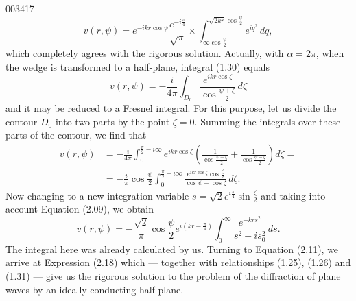 \begin{scanpage}{0034}{17}
\[v(r,\psi)=e^{-ikr\cos\psi}\frac{e^{-i\frac\pi4}}{\sqrt\pi}\times\int_{\infty\cos\frac\psi2}^{\sqrt{2kr}\cos\frac\psi2}e^{iq^2}\,dq,\tag{2.18}\]
which completely agrees with the rigorous solution. Actually, with $\alpha=2\pi$, when the wedge is transformed to a half-plane, integral (1.30) equals
\[v(r,\psi)=-\frac{i}{4\pi}\int_{D_0}\frac{e^{ikr\cos\zeta}}{\cos\frac{\psi+\zeta}{2}}\,d\zeta\tag{2.19}\]
and it may be reduced to a Fresnel integral. For this purpose, let us divide the contour $D_0$ into two parts by the point $\zeta=0$. Summing the integrals over these parts of the contour, we find that
\[\begin{aligned}v(r,\psi)&=-\frac{i}{4\pi}\int_0^{\frac\pi2-i\infty}e^{ikr\cos\zeta}\left(\frac1{\cos\frac{\psi+\zeta}{2}}+\frac1{\cos\frac{\psi-\zeta}{2}}\right)d\zeta=\\&=-\frac i\pi\cos\frac\psi2\int_0^{\frac\pi2-i\infty}\frac{e^{ikr\cos\zeta}\cos\frac\zeta2}{\cos\psi+\cos\zeta}\,d\zeta.\end{aligned}\]
Now changing to a new integration variable $s=\sqrt2e^{i\frac\pi4}\sin\frac\zeta2$ and taking into account Equation (2.09), we obtain
\[v(r,\psi)=-\frac{\sqrt2}{\pi}\cos\frac\psi2e^{i(kr-\frac\pi4)}\int_0^\infty\frac{e^{-krs^2}}{s^2-is_0^2}\,ds.\tag{2.20}\]
The integral here was already calculated by us. Turning to Equation (2.11), we arrive at Expression (2.18) which --- together with relationships (1.25), (1.26) and (1.31) --- give us the rigorous solution to the problem of the diffraction of plane waves by an ideally conducting half-plane.
\end{scanpage}
